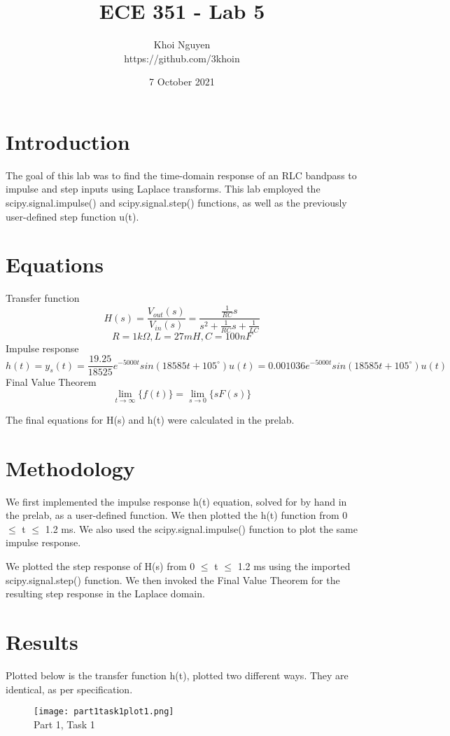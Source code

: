 \documentclass[11pt,a4,titlepage]{article}
\title{ECE 351 - Lab 5}
\author{Khoi Nguyen \\ https://github.com/3khoin}
\date{7 October 2021}
\begin{document}
\maketitle
\pagebreak

\tableofcontents
\pagebreak

\section{Introduction}
The goal of this lab was to find the time-domain response of an RLC bandpass to impulse and step inputs using Laplace transforms. This lab employed the scipy.signal.impulse() and scipy.signal.step() functions, as well as the previously user-defined step function u(t).

\section{Equations}
Transfer function
\[H(s) = \frac{V_{out}(s)}{V_{in}(s)} = \frac{\frac{1}{RC}s}{s^{2} + \frac{1}{RC}s + \frac{1}{LC}}\]
\[R = 1k\Omega, L = 27mH, C = 100nF\]
Impulse response
\[h(t) = y_{s}(t) = \frac{19.25}{18525}e^{-5000t}sin(18585t + 105^{\circ})u(t) = 0.001036e^{-5000t}sin(18585t + 105^{\circ})u(t)\]
Final Value Theorem
\[ \lim_{t\to\infty}\{f(t)\} = \lim_{s\to 0} \{sF(s)\}\]

The final equations for H(s) and h(t) were calculated in the prelab.

\section{Methodology}
We first implemented the impulse response h(t) equation, solved for by hand in the prelab, as a user-defined function. We then plotted the h(t) function from 0 $\leq$ t $\leq$ 1.2 ms. We also used the scipy.signal.impulse() function to plot the same impulse response.

We plotted the step response of H(s) from 0 $\leq$ t $\leq$ 1.2 ms using the imported scipy.signal.step() function. We then invoked the Final Value Theorem for the resulting step response in the Laplace domain.

\section{Results}
Plotted below is the transfer function h(t), plotted two different ways. They are identical, as per specification.
\begin{figure}[H]
	\centering
	\texttt{[image: part1task1plot1.png]}
	\\ Part 1, Task 1
\end{figure}
\end{document}
